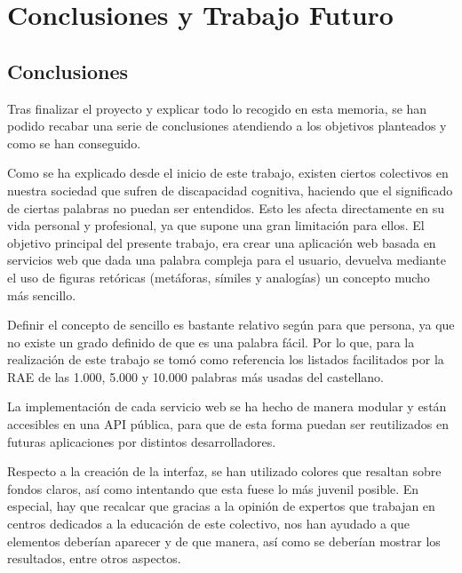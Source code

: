 \chapter{Conclusiones y Trabajo Futuro}
\label{cap:conclusionesyFuturo}

 

\section{Conclusiones}
\label{cap:sec:conclusiones}

Tras finalizar el proyecto y explicar todo lo recogido en esta memoria, se han podido recabar una serie de conclusiones atendiendo a los objetivos planteados y como se han conseguido.

Como se ha explicado desde el inicio de este trabajo, existen ciertos colectivos en nuestra sociedad que sufren de discapacidad cognitiva, haciendo que el significado de ciertas palabras no puedan ser entendidos. Esto les afecta directamente en su vida personal y profesional, ya que supone una gran limitación para ellos.
El objetivo principal del presente trabajo, era crear una aplicación web basada en servicios web que dada una palabra compleja para el usuario, devuelva mediante el uso de figuras retóricas (metáforas, símiles y analogías) un concepto mucho más sencillo.

Definir el concepto de sencillo es bastante relativo según para que persona, ya que no existe un grado definido de que es una palabra fácil. Por lo que, para la realización de este trabajo se tomó como referencia los listados facilitados por la RAE de las 1.000, 5.000 y 10.000 palabras más usadas del castellano.

La implementación de cada servicio web se ha hecho de manera modular y están accesibles en una API pública, para que de esta forma puedan ser reutilizados en futuras aplicaciones por distintos desarrolladores.

 Respecto a la creación de la interfaz, se han utilizado colores que resaltan sobre fondos claros, así como intentando que esta fuese lo más juvenil posible.
 En especial, hay que recalcar que gracias a la opinión de expertos que trabajan en centros dedicados a la educación de este colectivo, nos han ayudado a que elementos deberían aparecer y de que manera, así como se deberían mostrar los resultados, entre otros aspectos. 

